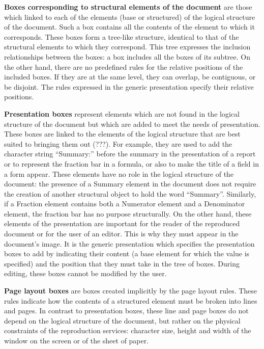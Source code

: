 {\bf Boxes corresponding to structural elements of the document} are
those which linked to each of the elements (base or structured) of
the logical structure of the document.  Such a box contains all the
contents of the element to which it corresponds.  These boxes form a
tree-like structure, identical to that of the structural elements to
which they correspond.  This tree expresses the inclusion relationships
between the boxes: a box includes all the boxes of its subtree.  On
the other hand, there are no predefined rules for the relative
positions of the included boxes.  If they are at the same level, they
can overlap, be contiguous, or be disjoint.  The rules expressed in
the generic presentation specify their relative positions.

{\bf Presentation boxes} represent elements which are not found in the
logical structure of the document but which are added to meet the
needs of presentation.  These boxes are linked to the elements of the
logical structure that are best suited to bringing them out (???).
For example, they are used to add the character string ``Summary:''
before the summary in the presentation of a report or to represent the
fraction bar in a formula, or also to make the title of a field in a
form appear.  These elements have no role in the logical structure of
the document: the presence of a Summary element in the document does
not require the creation of another structural object to hold the word
``Summary''. Similarly, if a Fraction element contains both a
Numerator element and a Denominator element, the fraction bar has no
purpose structurally.  On the other hand, these elements of the
presentation are important for the reader of the reproduced document
or for the user of an editor.  This is why they must appear in the
document's image.  It is the generic presentation which specifies the
presentation boxes to add by indicating their content (a base element
for which the value is specified) and the position that they must take
in the tree of boxes.  During editing, these boxes cannot be modified
by the user.

{\bf Page layout boxes} are boxes created implicitly by the page
layout rules.  These rules indicate how the contents of a structured
element must be broken into lines and pages.  In contrast to
presentation boxes, these line and page boxes do not depend on the
logical structure of the document, but rather on the physical
constraints of the reproduction services: character size, height and
width of the window on the screen or of the sheet of paper.

